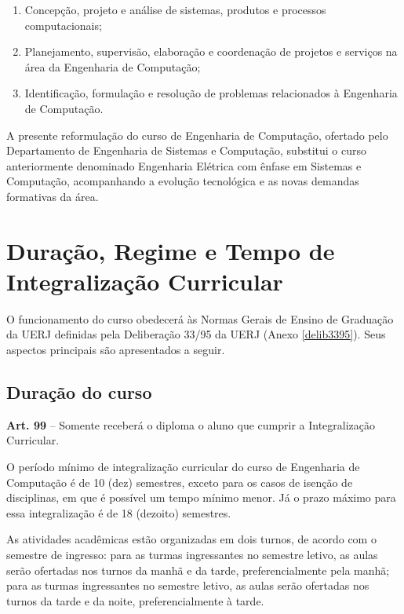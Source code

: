 \begin{enumerate}
  \item Concepção, projeto e análise de sistemas, produtos e processos computacionais;
  \item Planejamento, supervisão, elaboração e coordenação de projetos e serviços na área da Engenharia de Computação;
  \item Identificação, formulação e resolução de problemas relacionados à Engenharia de Computação.
\end{enumerate}

A presente reformulação do curso de Engenharia de Computação, ofertado pelo Departamento de Engenharia de Sistemas e Computação, substitui o curso anteriormente denominado Engenharia Elétrica com ênfase em Sistemas e Computação, acompanhando a evolução tecnológica e as novas demandas formativas da área.

\section{Duração, Regime e Tempo de Integralização Curricular}

O funcionamento do curso obedecerá às Normas Gerais de Ensino de Graduação da UERJ definidas pela Deliberação  33/95 da UERJ (Anexo \ref{delib3395}). Seus aspectos principais são apresentados a seguir.

\subsection{Duração do curso}
\label{sec:integralizacao}
\begin{itquotation}
  \textbf{Art. 99} -- Somente receberá o diploma o aluno que cumprir a Integralização Curricular.
\end{itquotation}

O período mínimo de integralização curricular do curso de Engenharia de Computação  é de 10 (dez) semestres, exceto para os casos de isenção de disciplinas, em que é possível um tempo mínimo menor. Já o prazo máximo para essa integralização é de 18 (dezoito) semestres.

As atividades acadêmicas estão organizadas em dois turnos, de acordo com o semestre de ingresso: para as turmas ingressantes no  semestre letivo, as aulas serão ofertadas nos turnos da manhã e da tarde, preferencialmente pela manhã; para as turmas ingressantes no  semestre letivo, as aulas serão ofertadas nos turnos da tarde e da noite, preferencialmente à tarde.

